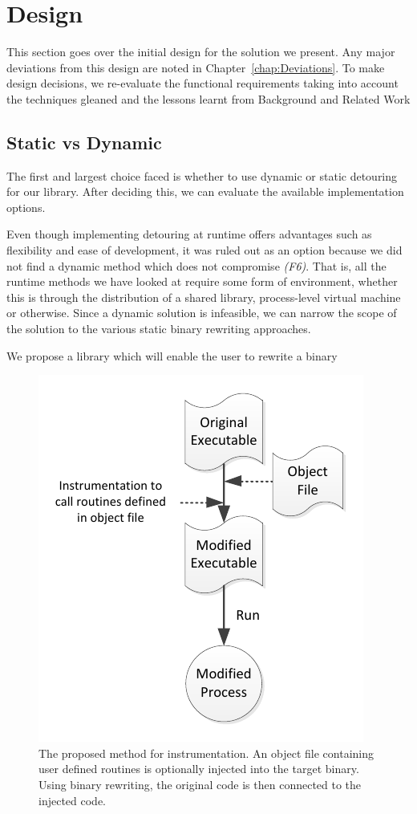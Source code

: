 \chapter{Design}\label{chap:Design}

This section goes over the initial design for the solution we present. Any major deviations from this design are noted in Chapter~\ref{chap:Deviations}. To make design decisions, we re-evaluate the functional requirements taking into account the techniques gleaned and the lessons learnt from Background and Related Work

\section{Static vs Dynamic}

The first and largest choice faced is whether to use dynamic or static detouring for our library. After deciding this, we can evaluate the available implementation options.

Even though implementing detouring at runtime offers advantages such as flexibility and ease of development, it was ruled out as an option because we did not find a dynamic method which does not compromise \emph{(F6)}. That is, all the runtime methods we have looked at require some form of environment, whether this is through the distribution of a shared library, process-level virtual machine or otherwise. Since a dynamic solution is infeasible, we can narrow the scope of the solution to the various static binary rewriting approaches.

We propose a library which will enable the user to rewrite a binary 

\begin{figure}[H]
 \centering
 \includegraphics{Workflow.pdf}
 \caption[Hierarchy]{The proposed method for instrumentation. An object file containing user defined routines is optionally injected into the target binary. Using binary rewriting, the original code is then connected to the injected code.}
\end{figure}



